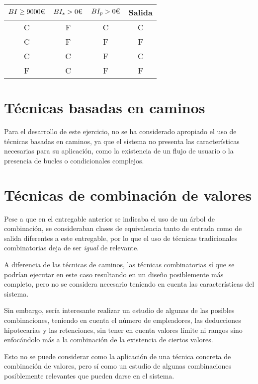 \begin{table}[H]
	\centering
	\begin{tabular}{|ccc|c|}
		\hline
		\rowcolor{gray!50}
		$BI\geq 9000\textup{€}$ & $BI_s > 0\textup{€}$ & $BI_{p} > 0\textup{€}$ & \textbf{Salida} \\
		\hline
		\hline
		C & F & C & C \\
		C & F & F & F \\
		C & C & F & C \\
		F & C & F & F \\
		\hline
	\end{tabular}
\end{table}

\section{Técnicas basadas en caminos}
Para el desarrollo de este ejercicio, no se ha considerado apropiado el uso de técnicas basadas
en caminos, ya que el sistema no presenta las características necesarias para su aplicación,
como la existencia de un flujo de usuario o la presencia de bucles o condicionales complejos.

\newpage{}
\section{Técnicas de combinación de valores}
Pese a que en el entregable anterior se indicaba el uso de un árbol de combinación, se consideraban
clases de equivalencia tanto de entrada como de salida diferentes a este entregable, por lo que
el uso de técnicas tradicionales combinatorias deja de ser \emph{igual} de relevante.

A diferencia de las técnicas de caminos, las técnicas combinatorias sí que se podrían ejecutar
en este caso resultando en un diseño posiblemente más completo, pero no se considera necesario
teniendo en cuenta las características del sistema.

Sin embargo, sería interesante realizar un estudio de algunas de las posibles combinaciones,
teniendo en cuenta el número de empleadores, las deducciones hipotecarias y las retenciones,
sin tener en cuenta valores límite ni rangos sino enfocándolo más a la combinación de la
existencia de ciertos valores.

Esto no se puede considerar como la aplicación de una técnica concreta de combinación de valores,
pero sí como un estudio de algunas combinaciones posiblemente relevantes que pueden darse en el
sistema.
